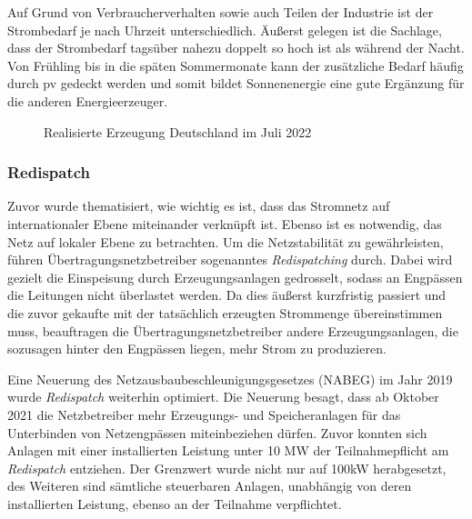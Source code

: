 \documentclass[12pt, a4paper]{article}
\begin{document}
Auf Grund von Verbraucherverhalten sowie auch Teilen der Industrie ist der Strombedarf je nach Uhrzeit unterschiedlich. Äußerst gelegen ist die Sachlage, dass der Strombedarf tagsüber nahezu doppelt so hoch ist als während der Nacht. Von Frühling bis in die späten Sommermonate kann der zusätzliche Bedarf häufig durch \ac{pv} gedeckt werden und somit bildet Sonnenenergie eine gute Ergänzung für die anderen Energieerzeuger. 


\begin{figure}
\centering
\def\svgwidth{450pt}
\fontsize{7}{10}\selectfont

\caption{Realisierte Erzeugung Deutschland im Juli 2022}
\label{fig:stromerzeugung_de_mai}
\end {figure}

\subsubsection{Redispatch}

Zuvor wurde thematisiert, wie wichtig es ist, dass das Stromnetz auf internationaler Ebene miteinander verknüpft ist. Ebenso ist es notwendig, das Netz auf lokaler Ebene zu betrachten. Um die Netzstabilität zu gewährleisten, führen Übertragungsnetzbetreiber sogenanntes \textit{Redispatching} durch. Dabei wird gezielt die Einspeisung durch Erzeugungsanlagen gedrosselt, sodass an Engpässen die Leitungen nicht überlastet werden. Da dies äußerst kurzfristig passiert und die zuvor gekaufte mit der tatsächlich erzeugten Strommenge übereinstimmen muss, beauftragen die Übertragungsnetzbetreiber andere Erzeugungsanlagen, die sozusagen hinter den Engpässen liegen, mehr Strom zu produzieren.

Eine Neuerung des Netzausbaubeschleunigungsgesetzes (NABEG) im Jahr 2019 wurde \textit{Redispatch} weiterhin optimiert. Die Neuerung besagt, dass ab Oktober 2021 die Netzbetreiber mehr Erzeugungs- und Speicheranlagen für das Unterbinden von Netzengpässen miteinbeziehen dürfen. Zuvor konnten sich Anlagen mit einer installierten Leistung unter 10 MW der Teilnahmepflicht am \textit{Redispatch} entziehen. Der Grenzwert wurde nicht nur auf 100kW herabgesetzt, des Weiteren sind sämtliche steuerbaren Anlagen, unabhängig von deren installierten Leistung, ebenso an der Teilnahme verpflichtet.

\end{document}
